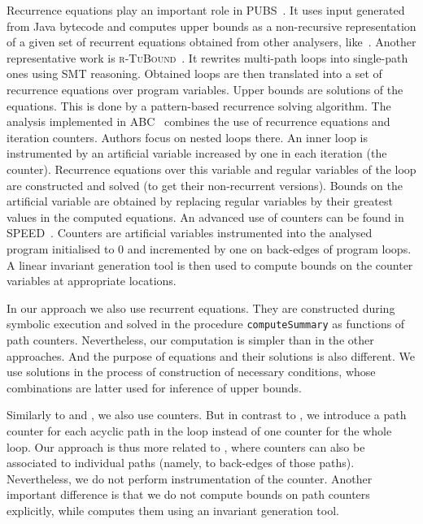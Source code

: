 \documentclass[10pt,a4paper]{article}
\newcommand{\PUBS}{\textsc{PUBS}\xspace}
\begin{document}
Recurrence equations play an important role in \PUBS~\cite{PUBS2008}. It
uses input generated from Java bytecode and computes upper bounds as a
non-recursive representation of a given set of recurrent equations obtained
from other analysers, like~\cite{PUBS2007}. Another representative work is
\textsc{r-TuBound}~\cite{rTuBound2012}. It rewrites multi-path loops into
single-path ones using SMT reasoning. Obtained loops are then translated
into a set of recurrence equations over program variables. Upper bounds are
solutions of the equations. This is done by a pattern-based recurrence
solving algorithm. The analysis implemented in \textsc{ABC}~\cite{ABC}
combines the use of recurrence equations and iteration counters. Authors
focus on nested loops there. An inner loop is instrumented by an artificial
variable increased by one in each iteration (the counter). Recurrence
equations over this variable and regular variables of the loop are
constructed and solved (to get their non-recurrent versions). Bounds on the
artificial variable are obtained by replacing regular variables by their
greatest values in the computed equations.  An advanced use of counters can
be found in \textsc{SPEED}~\cite{Gulwani2009}.  Counters are artificial
variables instrumented into the analysed program initialised to 0 and
incremented by one on back-edges of program loops. A linear invariant
generation tool is then used to compute bounds on the counter variables at
appropriate locations.

In our approach we also use recurrent equations. They are constructed during
symbolic execution and solved in the procedure \texttt{computeSummary} as
functions of path counters. Nevertheless, our computation is simpler than
in the other approaches. And the purpose of equations and their solutions is
also different. We use solutions in the process of construction of necessary
conditions, whose combinations are latter used for inference of upper bounds.

Similarly to \cite{ABC} and \cite{Gulwani2009}, we also use counters. But in
contrast to \cite{ABC}, we introduce a path counter for each acyclic path in
the loop instead of one counter for the whole loop. Our approach is thus
more related to \cite{Gulwani2009}, where counters can also be associated to
individual paths (namely, to back-edges of those paths). Nevertheless, we do
not perform instrumentation of the counter. Another important difference is
that we do not compute bounds on path counters explicitly, while
\cite{Gulwani2009} computes them using an invariant generation tool.
\end{document}

